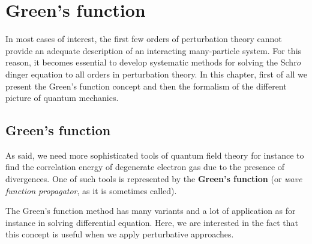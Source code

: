 \documentclass[../main/main.tex]{subfiles}
\begin{document}
\chapter{Green's function}


In most cases of interest, the first few orders of perturbation theory cannot provide an adequate description of an interacting many-particle system. For this reason, it becomes essential to develop systematic methods for solving the Schr$\ddot{o}$dinger equation to all orders in perturbation theory.
In this chapter, first of all we present the Green's function concept and then the formalism of the different picture of quantum mechanics.

\section{Green's function}
\label{sec:7_1}
As said, we need more sophisticated tools of quantum field theory for instance to find the correlation energy of degenerate electron gas due to the presence of divergences. One of such tools is represented by the \textbf{Green's function} (or \emph{wave function propagator}, as it is sometimes called).

The Green's function method has many variants and a lot of application as for instance in solving differential equation. Here, we are interested in the fact that this concept is useful when we apply perturbative approaches.
\end{document}
